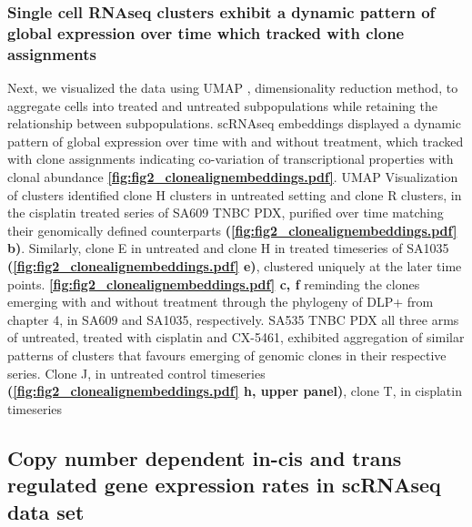 \subsubsection{Single cell RNAseq clusters exhibit a dynamic pattern of global expression over time which tracked with clone assignments}
Next, we visualized the data using UMAP \cite{becht2019dimensionality}, dimensionality reduction method, to aggregate cells into treated and untreated subpopulations while retaining the relationship between subpopulations. scRNAseq embeddings displayed a dynamic pattern of global expression over time with and without treatment, which tracked with clone assignments indicating co-variation of transcriptional properties with clonal abundance \textbf{\autoref{fig:fig2_clonealignembeddings.pdf}}. UMAP Visualization of clusters identified clone H clusters in untreated setting and clone R clusters, in the cisplatin treated series of SA609 TNBC PDX, purified over time matching their genomically defined counterparts \textbf{(\autoref{fig:fig2_clonealignembeddings.pdf} b)}. Similarly, clone E in untreated and clone H in treated timeseries of SA1035  \textbf{(\autoref{fig:fig2_clonealignembeddings.pdf} e)}, clustered uniquely at the later time points. \textbf{\autoref{fig:fig2_clonealignembeddings.pdf} c, f} reminding the clones emerging with and without treatment through the phylogeny of DLP+ from chapter 4, in SA609 and SA1035, respectively.  SA535 TNBC PDX all three arms of untreated, treated with cisplatin and CX-5461, exhibited aggregation of similar patterns of clusters that favours emerging of genomic clones in their respective series. Clone J, in untreated control timeseries \textbf{(\autoref{fig:fig2_clonealignembeddings.pdf} h, upper panel)}, clone T, in cisplatin timeseries 


\subsection{Copy number dependent in-cis and trans regulated gene expression rates in scRNAseq data set}



